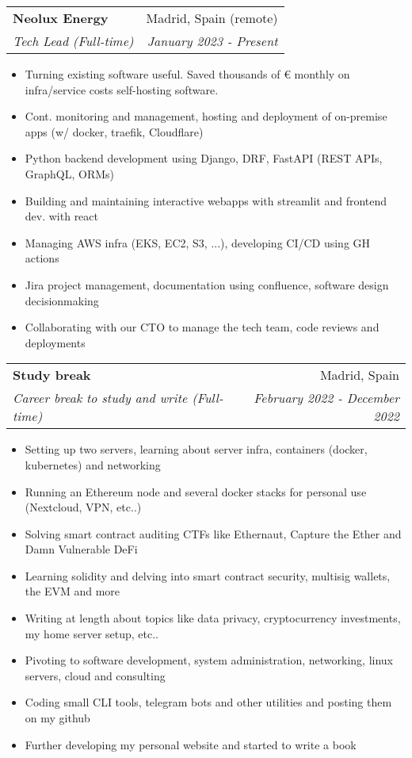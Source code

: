 \documentclass[a4paper,20pt]{article}
\makeatletter
\newcommand{\resumeSubheading}[4]{
  \vspace{-1pt}\item
    \begin{tabular*}{0.97\textwidth}{l@{\extracolsep{\fill}}r}
      \textbf{#1} & #2 \\
      \textit{#3} & \textit{#4} \\
    \end{tabular*}\vspace{-5pt}
}
\makeatother
\begin{document}
  \resumeSubheading{Neolux Energy}{Madrid, Spain (remote)}
    {Tech Lead (Full-time)}{January 2023 - Present}
\begin{itemize} \itemsep-0.24em
  \item Turning existing software useful. Saved thousands of € monthly on infra/service costs self-hosting software.
  \item Cont. monitoring and management, hosting and deployment of on-premise apps (w/ docker, traefik, Cloudflare)
  \item Python backend development using Django, DRF, FastAPI (REST APIs, GraphQL, ORMs)
  \item Building and maintaining interactive webapps with streamlit and frontend dev. with react
  \item Managing AWS infra (EKS, EC2, S3, ...), developing CI/CD using GH actions
  \item Jira project management, documentation using confluence, software design decisionmaking
  \item Collaborating with our CTO to manage the tech team, code reviews and deployments
\end{itemize}
\vspace{-2pt}
  \resumeSubheading{Study break}{Madrid, Spain}
    {Career break to study and write (Full-time)}{February 2022 - December 2022}
\begin{itemize} \itemsep-0.24em
  \item Setting up two servers, learning about server infra, containers (docker, kubernetes) and networking
  \item Running an Ethereum node and several docker stacks for personal use (Nextcloud, VPN, etc..)
  \item Solving smart contract auditing CTFs like Ethernaut, Capture the Ether and Damn Vulnerable DeFi
  \item Learning solidity and delving into smart contract security, multisig wallets, the EVM and more
  \item Writing at length about topics like data privacy, cryptocurrency investments, my home server setup, etc..
  \item Pivoting to software development, system administration, networking, linux servers, cloud and consulting
  \item Coding small CLI tools, telegram bots and other utilities and posting them on my github
  \item Further developing my personal website and started to write a book
\end{itemize}
\end{document}
